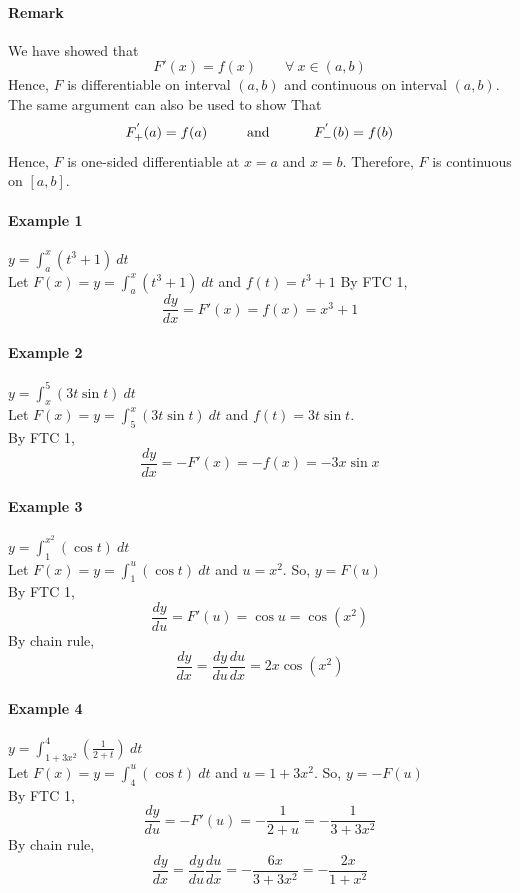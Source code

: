 \documentclass[12pt]{article}
\newcommand\tab[1][1cm]{\hspace*{#1}}
\begin{document}
\paragraph{Remark} We have showed that
\[
    F'(x) = f(x)\qquad \forall\: x \in (a,b)
\]
Hence, $F$ is differentiable on interval $(a, b)$ and continuous on interval $(a, b)$. The same argument can also be used to show That
\[
    F^{'}_{ + }(a) = f(a) \textrm{\tab and \tab} F^{'}_{- }(b) = f(b)
\]
Hence, $F$ is one-sided differentiable at $x = a$ and $x = b$. Therefore, $F$ is continuous on $[a, b]$.

\paragraph{Example 1} $y = \int_a^x (t^3 + 1)\: dt$ \\
Let $F(x) = y = \int_a^x (t^3 + 1)\: dt$ and $f(t) = t^3 + 1$
By FTC 1, 
\[
    \frac{dy}{dx} = F'(x) = f(x) = x^3 + 1 
\]

\paragraph{Example 2} $y = \int_x^5 (3t \sin t)\: dt$ \\
Let $F(x) = y = \int_5^x (3t \sin t)\: dt$ and $f(t) = 3t \sin t$.  \\
By FTC 1, 
\[
    \frac{dy}{dx} = - F'(x) = - f (x) = - 3x \sin x
\]

\paragraph{Example 3} $y = \int_1^{x^2} (\cos t)\: dt$ \\
Let $F(x) = y = \int_1^u (\cos t)\: dt$ and $u = x^2$. So, $y = F(u)$ \\
By FTC 1, 
\[
    \frac{dy}{du} = F'(u) = \cos u = \cos (x^2)
\]
By chain rule,
\[
    \frac{dy}{dx} = \frac{dy}{du} \frac{du}{dx} = 2x \cos (x^2)
\]

\paragraph{Example 4} $y = \int_{1 + 3x^2}^{4} (\frac{1}{2 + t})\: dt$ \\
Let $F(x) = y = \int_4^u (\cos t)\: dt$ and $u = 1 + 3x^2$. So, $y = - F(u)$ \\
By FTC 1, 
\[
    \frac{dy}{du} = - F'(u) = - \frac{1}{2 + u} = - \frac{1}{3 + 3x^2}
\]
By chain rule,
\[
    \frac{dy}{dx} = \frac{dy}{du} \frac{du}{dx} = - \frac{6x}{3 + 3x^2} = - \frac{2x}{1 + x^2}
\]
\end{document}
